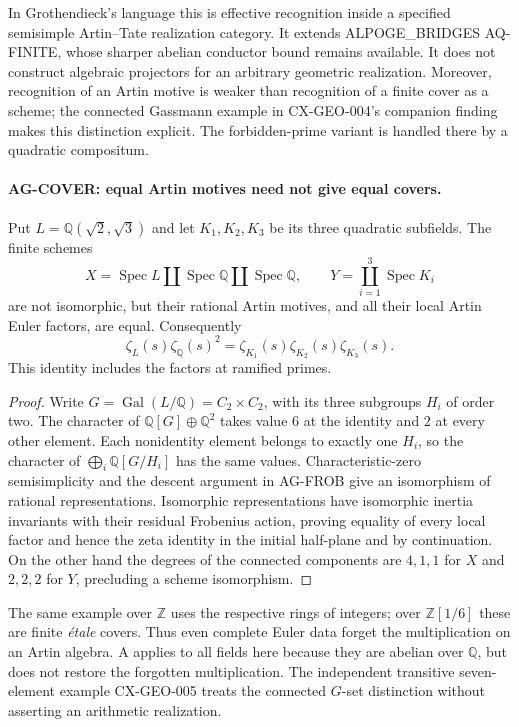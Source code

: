 \documentclass[11pt,a4paper]{article}
\begin{document}
In Grothendieck's language this is effective recognition inside a specified
semisimple Artin--Tate realization category. It extends
ALPOGE\_BRIDGES AQ-FINITE, whose sharper abelian conductor bound remains
available. It does not construct algebraic projectors for an arbitrary
geometric realization. Moreover, recognition of an Artin motive is weaker
than recognition of a finite cover as a scheme; the connected Gassmann
example in CX-GEO-004's companion finding makes this distinction explicit.
The forbidden-prime variant is handled there by a quadratic compositum.

\paragraph{AG-COVER: equal Artin motives need not give equal covers.}
Put $L=\mathbb Q(\sqrt2,\sqrt3)$ and let $K_1,K_2,K_3$ be its three
quadratic subfields. The finite schemes
\[
 X=\operatorname{Spec}L\amalg\operatorname{Spec}\mathbb Q
       \amalg\operatorname{Spec}\mathbb Q,
 \qquad
 Y=\coprod_{i=1}^3\operatorname{Spec}K_i
\]
are not isomorphic, but their rational Artin motives, and all their local
Artin Euler factors, are equal. Consequently
\[
 \zeta_L(s)\zeta_{\mathbb Q}(s)^2
       =\zeta_{K_1}(s)\zeta_{K_2}(s)\zeta_{K_3}(s).
\]
This identity includes the factors at ramified primes.

\begin{proof}
Write $G=\operatorname{Gal}(L/\mathbb Q)=C_2\times C_2$, with its three
subgroups $H_i$ of order two. The character of
$\mathbb Q[G]\oplus\mathbb Q^2$ takes value $6$ at the identity and
$2$ at every other element. Each nonidentity element belongs to exactly
one $H_i$, so the character of $\bigoplus_i\mathbb Q[G/H_i]$ has the
same values. Characteristic-zero semisimplicity and the descent argument
in AG-FROB give an isomorphism of rational representations. Isomorphic
representations have isomorphic inertia invariants with their residual
Frobenius action, proving equality of every local factor and hence the
zeta identity in the initial half-plane and by continuation. On the other
hand the degrees of the connected components are $4,1,1$ for $X$ and
$2,2,2$ for $Y$, precluding a scheme isomorphism.
\end{proof}

The same example over $\mathbb Z$ uses the respective rings of integers;
over $\mathbb Z[1/6]$ these are finite \emph{\'etale} covers. Thus even
complete Euler data forget the multiplication on an Artin algebra. A
applies to all fields here because they are abelian over $\mathbb Q$,
but does not restore the forgotten multiplication. The independent
transitive seven-element example CX-GEO-005 treats the connected
$G$-set distinction without asserting an arithmetic realization.
\end{document}
